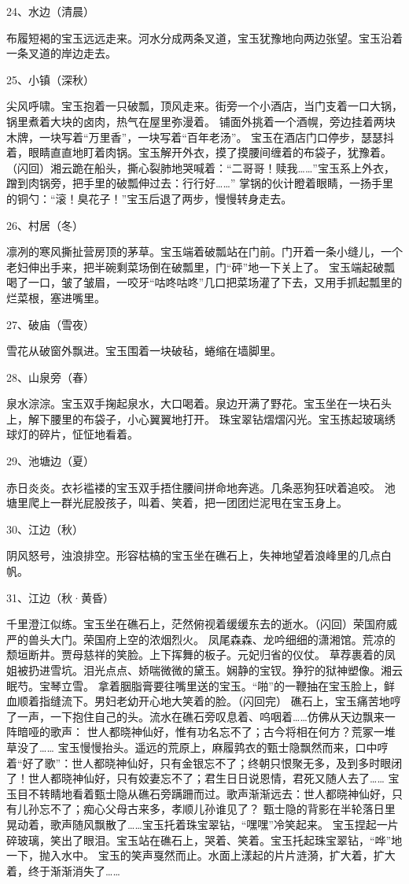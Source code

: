 24、水边（清晨）\par
布履短褐的宝玉远远走来。河水分成两条叉道，宝玉犹豫地向两边张望。宝玉沿着一条叉道的岸边走去。

25、小镇（深秋）\par
尖风呼啸。宝玉抱着一只破瓢，顶风走来。街旁一个小酒店，当门支着一口大锅，锅里煮着大块的卤肉，热气在屋里弥漫着。
铺面外挑着一个酒幌，旁边挂着两块木牌，一块写着“万里香”，一块写着“百年老汤”。
宝玉在酒店门口停步，瑟瑟抖着，眼睛直直地盯着肉锅。宝玉解开外衣，摸了摸腰间缠着的布袋子，犹豫着。
（闪回）湘云跪在船头，撕心裂肺地哭喊着：“二哥哥！赎我……”宝玉系上外衣，蹭到肉锅旁，把手里的破瓢伸过去：行行好……”
掌锅的伙计瞪着眼睛，一扬手里的铜勺：“滚！臭花子！”宝玉后退了两步，慢慢转身走去。

26、村居（冬）\par
凛冽的寒风撕扯营房顶的茅草。宝玉端着破瓢站在门前。门开着一条小缝儿，一个老妇伸出手来，把半碗剩菜场倒在破瓢里，门“砰”地一下关上了。
宝玉端起破瓢喝了一口，皱了皱眉，一咬牙“咕咚咕咚”几口把菜场灌了下去，又用手抓起瓢里的烂菜根，塞进嘴里。

27、破庙（雪夜）\par
雪花从破窗外飘进。宝玉围着一块破毡，蜷缩在墙脚里。

28、山泉旁（春）\par
泉水淙淙。宝玉双手掬起泉水，大口喝着。泉边开满了野花。宝玉坐在一块石头上，解下腰里的布袋子，小心翼翼地打开。
珠宝翠钻熠熠闪光。宝玉拣起玻璃绣球灯的碎片，怔怔地看着。

29、池塘边（夏）\par
赤日炎炎。衣衫褴褛的宝玉双手捂住腰间拼命地奔逃。几条恶狗狂吠着追咬。
池塘里爬上一群光屁股孩子，叫着、笑着，把一团团烂泥甩在宝玉身上。

30、江边（秋）\par
阴风怒号，浊浪排空。形容枯槁的宝玉坐在礁石上，失神地望着浪峰里的几点白帆。

31、江边（秋·黄昏）\par
千里澄江似练。宝玉坐在礁石上，茫然俯视着缓缓东去的逝水。（闪回）荣国府威严的兽头大门。荣国府上空的浓烟烈火。
凤尾森森、龙吟细细的潇湘馆。荒凉的颓垣断井。贾母慈祥的笑脸。上下挥舞的板子。元妃归省的仪仗。
草荐裹着的凤姐被扔进雪坑。泪光点点、娇喘微微的黛玉。娴静的宝钗。狰狞的狱神塑像。湘云眠芍。宝琴立雪。
拿着胭脂膏要往嘴里送的宝玉。“啪”的一鞭抽在宝玉脸上，鲜血顺着指缝流下。男妇老幼开心地大笑着的脸。（闪回完）
礁石上，宝玉痛苦地哼了一声，一下抱住自己的头。流水在礁石旁叹息着、呜咽着……仿佛从天边飘来一阵暗哑的歌声：
世人都晓神仙好，惟有功名忘不了；古今将相在何方？荒冢一堆草没了……
宝玉慢慢抬头。遥远的荒原上，麻履鹑衣的甄士隐飘然而来，口中哼着“好了歌”：世人都晓神仙好，只有金银忘不了；终朝只恨聚无多，及到多时眼闭了！世人都晓神仙好，只有姣妻忘不了；君生日日说恩情，君死又随人去了……
宝玉目不转睛地看着甄士隐从礁石旁蹒跚而过。歌声渐渐远去：世人都晓神仙好，只有儿孙忘不了；痴心父母古来多，孝顺儿孙谁见了？
甄士隐的背影在半轮落日里晃动着，歌声随风飘散了……宝玉托着珠宝翠钻，“嘿嘿”冷笑起来。
宝玉捏起一片碎玻璃，笑出了眼泪。宝玉站在礁石上，哭着、笑着。宝玉托起珠宝翠钻，“哗”地一下，抛入水中。
宝玉的笑声戛然而止。水面上漾起的片片涟漪，扩大着，扩大着，终于渐渐消失了……

